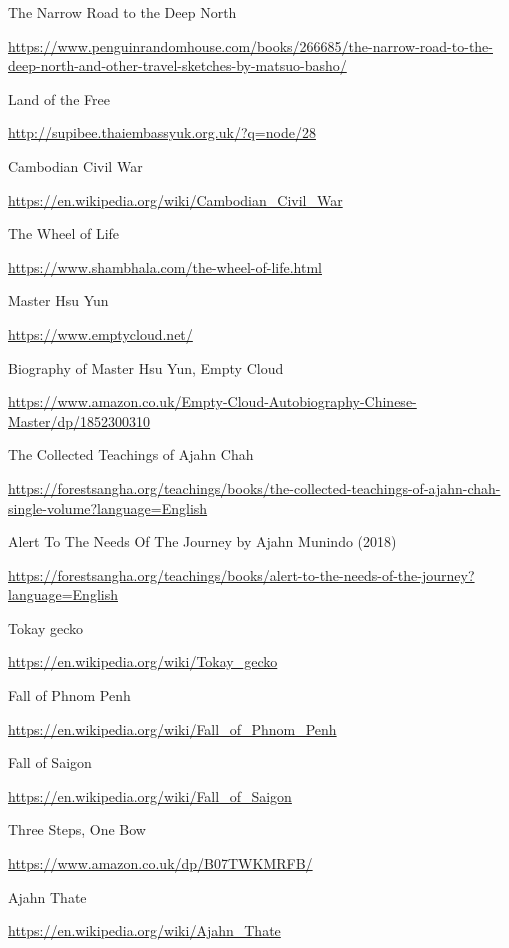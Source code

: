 \begin{thebibliography}{9}
 The Narrow Road to the Deep North

  {\urlsize \url{https://www.penguinrandomhouse.com/books/266685/the-narrow-road-to-the-deep-north-and-other-travel-sketches-by-matsuo-basho/}}

 Land of the Free

  {\urlsize \url{http://supibee.thaiembassyuk.org.uk/?q=node/28}}

 Cambodian Civil War

  {\urlsize \url{https://en.wikipedia.org/wiki/Cambodian_Civil_War}}

 The Wheel of Life

  {\urlsize \url{https://www.shambhala.com/the-wheel-of-life.html}}

 Master Hsu Yun

  {\urlsize \url{https://www.emptycloud.net/}}

 Biography of Master Hsu Yun, Empty Cloud

  {\urlsize \url{https://www.amazon.co.uk/Empty-Cloud-Autobiography-Chinese-Master/dp/1852300310}}

 The Collected Teachings of Ajahn Chah

  {\urlsize \url{https://forestsangha.org/teachings/books/the-collected-teachings-of-ajahn-chah-single-volume?language=English}}

 Alert To The Needs Of The Journey by Ajahn Munindo (2018)

  {\urlsize \url{https://forestsangha.org/teachings/books/alert-to-the-needs-of-the-journey?language=English}}

 Tokay gecko

  {\urlsize \url{https://en.wikipedia.org/wiki/Tokay_gecko}}

 Fall of Phnom Penh

  {\urlsize \url{https://en.wikipedia.org/wiki/Fall_of_Phnom_Penh}}

 Fall of Saigon

  {\urlsize \url{https://en.wikipedia.org/wiki/Fall_of_Saigon}}

 Three Steps, One Bow

  {\urlsize \url{https://www.amazon.co.uk/dp/B07TWKMRFB/}}

 Ajahn Thate

  {\urlsize \url{https://en.wikipedia.org/wiki/Ajahn_Thate}}


\end{thebibliography}
